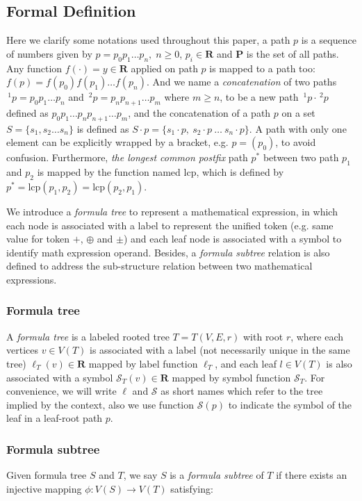 \documentclass{acm_proc_article-sp}
\begin{document}
\subsection{Formal Definition}
Here we clarify some notations used throughout this paper, a path $p$ is a sequence of numbers given by $p = p_0 p_1 \ldots p_n,\; n\ge0$, $p_i \in \mathbf{R}$ and $\mathbf{P}$ is the set of all paths.
Any function $f(\cdot) = y \in \mathbf{R}$ applied on path $p$ is mapped to a path too: $f(p)=f(p_0)f(p_1) \ldots f(p_n)$.
And we name  a \textit{concatenation} of two paths $\,^1p = p_0p_1 \ldots p_n$ and $\,^2p = p_np_{n+1} \ldots p_m$ where $m \ge n$, to be a new path $\,^1p \cdot \,^2p$ defined as $p_0p_1 \ldots p_n p_{n+1} \ldots p_m$,
and the concatenation of a path $p$ on a set $S = \{ s_1, s_2 \ldots s_n \}$ is defined as $S \cdot p = \{ s_1\cdot p,\  s_2\cdot p \ \ldots \ s_n\cdot p \}$.
A path with only one element can be explicitly wrapped by a bracket, e.g. $p=(p_0)$, to avoid confusion.
Furthermore, \textit{the longest common postfix} path $p^*$ between two path $p_1$ and $p_2$ is mapped by the function named $\mathrm{lcp}$, which is defined by $p^* = \mathrm{lcp}(p_1, p_2) = \mathrm{lcp}(p_2, p_1)$.

We introduce a \textit{formula tree} to represent a mathematical expression, in which each node is associated with a label to represent the unified token (e.g. same value for token $+$, $\oplus$ and $\pm$) and each leaf node is associated with a symbol to identify math expression operand. 
Besides, a \textit{formula subtree} relation is also defined to address the sub-structure relation between two mathematical expressions.

\subsubsection{Formula tree}
A \textit{formula tree} is a labeled rooted tree $T = T(V,E,r)$ with root $r$, where each vertices $v \in V(T)$ is associated with a label (not necessarily unique in the same tree) $\ell_T(v) \in \mathbf{R}$ mapped by label function $\ell_T$,
and each leaf $l \in V(T)$ is also associated with a symbol $\mathcal{S}_T(v) \in \mathbf{R}$ mapped by symbol function $\mathcal{S}_T$. For convenience, we will write $\ell$ and $\mathcal{S}$ as short names which refer to the tree implied by the context, also we use function $\mathcal{S}(p)$ to indicate the symbol of the leaf in a leaf-root path $p$.

\subsubsection{Formula subtree}
\label{frmlsubtreeDef}
Given formula tree $S$ and $T$, we say $S$ is a \textit{formula subtree} of $T$ if there exists an injective mapping $\phi: V(S) \rightarrow V(T)$ satisfying:
\end{document}
